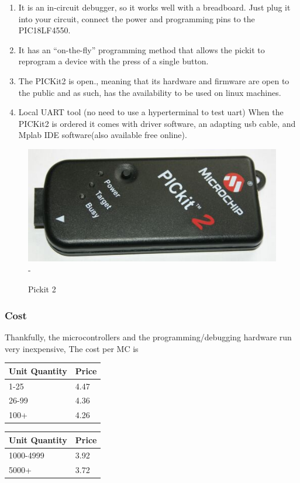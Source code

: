 \documentclass[12pt]{article}
\begin{document}
\begin{enumerate}
\item It is an in-circuit debugger, so it works well with a breadboard. Just plug it into your circuit,
connect the power and programming pins to the PIC18LF4550.
\item It has an “on-the-fly” programming method that allows the pickit to reprogram a device with the
press of a single button.
\item The PICKit2 is open., meaning that its hardware and firmware are open to the public and as such,
has the availability to be used on linux machines.
\item Local UART tool (no need to use a hyperterminal to test uart)
When the PICKit2 is ordered it comes with driver software, an adapting usb cable, and Mplab IDE
software(also available free online).
\end{enumerate}

\begin{figure}[h]
  \centering
  \includegraphics[scale=.5]{images/pickit}
-  \caption{Pickit 2}
  \label{img:pic}
\end{figure}

\subsubsection{Cost}
Thankfully, the microcontrollers and the programming/debugging hardware run very inexpensive,
The cost per MC is \hfill \\

\begin{tabular}{ l | l }
  Unit Quantity & Price \\
  \hline
  1-25 & 4.47 \\
  26-99 & 4.36 \\
  100+ & 4.26 \\
\end{tabular} 

\begin{tabular}{l | l}
  Unit Quantity & Price \\
  \hline
  1000-4999 & 3.92 \\
  5000+ & 3.72 \\
\end{tabular}
\hfill \\\\
\end{document}
